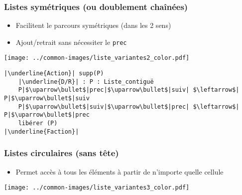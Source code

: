\documentclass[table,handout,tikz,12pt,svgnames]{beamer}
\begin{document}
\begin{frame}[fragile=singleslide]
	\frametitle{Listes symétriques \large (ou doublement chaînées)}
	\begin{block}{}
		\begin{itemize}
			\item Facilitent le parcours symétriques (dans les 2 sens)
			\item Ajout/retrait sans nécessiter le \texttt{prec}
		\end{itemize}
		\vspace{-2em}
		\begin{center}
			{\texttt{[image: ../common-images/liste\_variantes2\_color.pdf]}}
		\end{center}
	\end{block}
	\vspace{-1cm}
	\begin{block}{}
		\begin{verbatim}
|\underline{Action}| supp(P)
	|\underline{D/R}| : P : Liste_contiguë
	P|$\uparrow\bullet$|prec|$\uparrow\bullet$|suiv| $\leftarrow$| P|$\uparrow\bullet$|suiv
	P|$\uparrow\bullet$|suiv|$\uparrow\bullet$|prec| $\leftarrow$| P|$\uparrow\bullet$|prec
	libérer (P)
|\underline{Faction}|
		\end{verbatim}
	\end{block}
\end{frame}


\begin{frame}[fragile=singleslide]
	\frametitle{Listes circulaires (sans tête)}
	\begin{block}{}
		\begin{itemize}
			\item Permet accès à tous les éléments à partir de n'importe quelle cellule
		\end{itemize}
	\end{block}
	\begin{center}
		\hspace{-1.5cm}
		{\texttt{[image: ../common-images/liste\_variantes3\_color.pdf]}}
	\end{center}
\end{frame}
\end{document}
